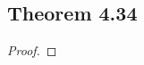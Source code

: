 \documentclass[../../main.tex]{subfiles}
\begin{document}
\subsection{Theorem 4.34}
\begin{wts}

\end{wts}
\begin{proof}

\end{proof}
\end{document}
